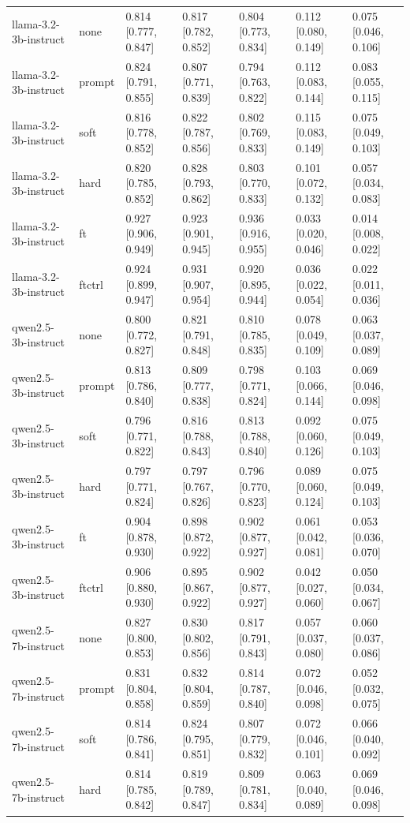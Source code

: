 \begin{tabular}{lllllll}
llama-3.2-3b-instruct & none & 0.814 [0.777, 0.847] & 0.817 [0.782, 0.852] & 0.804 [0.773, 0.834] & 0.112 [0.080, 0.149] & 0.075 [0.046, 0.106] \\
llama-3.2-3b-instruct & prompt & 0.824 [0.791, 0.855] & 0.807 [0.771, 0.839] & 0.794 [0.763, 0.822] & 0.112 [0.083, 0.144] & 0.083 [0.055, 0.115] \\
llama-3.2-3b-instruct & soft & 0.816 [0.778, 0.852] & 0.822 [0.787, 0.856] & 0.802 [0.769, 0.833] & 0.115 [0.083, 0.149] & 0.075 [0.049, 0.103] \\
llama-3.2-3b-instruct & hard & 0.820 [0.785, 0.852] & 0.828 [0.793, 0.862] & 0.803 [0.770, 0.833] & 0.101 [0.072, 0.132] & 0.057 [0.034, 0.083] \\
llama-3.2-3b-instruct & ft & 0.927 [0.906, 0.949] & 0.923 [0.901, 0.945] & 0.936 [0.916, 0.955] & 0.033 [0.020, 0.046] & 0.014 [0.008, 0.022] \\
llama-3.2-3b-instruct & ftctrl & 0.924 [0.899, 0.947] & 0.931 [0.907, 0.954] & 0.920 [0.895, 0.944] & 0.036 [0.022, 0.054] & 0.022 [0.011, 0.036] \\
qwen2.5-3b-instruct & none & 0.800 [0.772, 0.827] & 0.821 [0.791, 0.848] & 0.810 [0.785, 0.835] & 0.078 [0.049, 0.109] & 0.063 [0.037, 0.089] \\
qwen2.5-3b-instruct & prompt & 0.813 [0.786, 0.840] & 0.809 [0.777, 0.838] & 0.798 [0.771, 0.824] & 0.103 [0.066, 0.144] & 0.069 [0.046, 0.098] \\
qwen2.5-3b-instruct & soft & 0.796 [0.771, 0.822] & 0.816 [0.788, 0.843] & 0.813 [0.788, 0.840] & 0.092 [0.060, 0.126] & 0.075 [0.049, 0.103] \\
qwen2.5-3b-instruct & hard & 0.797 [0.771, 0.824] & 0.797 [0.767, 0.826] & 0.796 [0.770, 0.823] & 0.089 [0.060, 0.124] & 0.075 [0.049, 0.103] \\
qwen2.5-3b-instruct & ft & 0.904 [0.878, 0.930] & 0.898 [0.872, 0.922] & 0.902 [0.877, 0.927] & 0.061 [0.042, 0.081] & 0.053 [0.036, 0.070] \\
qwen2.5-3b-instruct & ftctrl & 0.906 [0.880, 0.930] & 0.895 [0.867, 0.922] & 0.902 [0.877, 0.927] & 0.042 [0.027, 0.060] & 0.050 [0.034, 0.067] \\
qwen2.5-7b-instruct & none & 0.827 [0.800, 0.853] & 0.830 [0.802, 0.856] & 0.817 [0.791, 0.843] & 0.057 [0.037, 0.080] & 0.060 [0.037, 0.086] \\
qwen2.5-7b-instruct & prompt & 0.831 [0.804, 0.858] & 0.832 [0.804, 0.859] & 0.814 [0.787, 0.840] & 0.072 [0.046, 0.098] & 0.052 [0.032, 0.075] \\
qwen2.5-7b-instruct & soft & 0.814 [0.786, 0.841] & 0.824 [0.795, 0.851] & 0.807 [0.779, 0.832] & 0.072 [0.046, 0.101] & 0.066 [0.040, 0.092] \\
qwen2.5-7b-instruct & hard & 0.814 [0.785, 0.842] & 0.819 [0.789, 0.847] & 0.809 [0.781, 0.834] & 0.063 [0.040, 0.089] & 0.069 [0.046, 0.098] \\
\bottomrule
\end{tabular}
